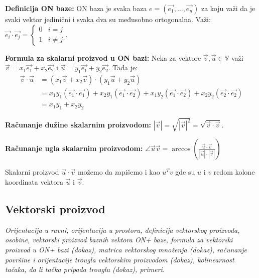 \documentclass[12pt]{article}
\newcommand{\vek}[1]{\overrightarrow{#1}}
\begin{document}
\textbf{Definicija ON baze:} ON baza je svaka baza $e=(\vek{e_1},\dotsc,
    \vek{e_n})$ za koju važi da je svaki vektor jedinični i svaka dva su
međusobno ortogonalna. Važi: $\vek{e_i}\cdot\vek{e_j} =
    \begin{cases}
        0 & i=j     \\
        1 & i\neq j
    \end{cases}$.
\par

\textbf{Formula za skalarni proizvod u ON bazi:} Neka za vektore $\vek{v},
    \vek{u}\in\mathbb{V}$ važi $\vek{v}=x_1\vek{e_1}+x_2\vek{e_2}$ i
$\vek{u}=y_1\vek{e_1}+y_2\vek{e_2}$. Tada je:
\begin{align*}
    \vek{v}\cdot\vek{u} & = (x_1\vek{v}+x_2\vek{v})\cdot(y_1\vek{u}+y_2\vek{u})                                                                             \\
                        & = x_1y_1(\vek{e_1}\cdot\vek{e_1})+x_2y_1(\vek{e_1}\cdot\vek{e_2})+x_1y_2(\vek{e_1}\cdot\vek{e_2})+x_2y_2(\vek{e_2}\cdot\vek{e_2}) \\
                        & = x_1y_1+x_2y_2
\end{align*}
\par

\textbf{Računanje dužine skalarnim proizvodom:} $|\vek{v}|=\sqrt{|\vek{v}|^2}=
    \sqrt{\vek{v}\cdot\vek{v}}$.
\par

\textbf{Računanje ugla skalarnim proizvodom:} $\angle{\vek{u}\vek{v}}=
    \arccos(\frac{\vek{u}\cdot\vek{v}}{|\vek{u}|\cdot|\vek{v}|})$
\par

Skalarni proizvod $\vek{u}\cdot\vek{v}$ možemo da zapišemo i kao $u^Tv$ gde su
$u$ i $v$ redom kolone koordinata vektora $\vek{u}$ i $\vek{v}$.
\par

\subsection{Vektorski proizvod}
\textit{Orijentacija u ravni, orijentacija u prostoru, definicija vektorskog
    proizvoda, osobine, vektorski proizvod baznih vektora ON+ baze, formula za
    vektorski proizvod u ON+ bazi (dokaz), matrica vektorskog množenja (dokaz),
    računanje površine i orijentacije trougla vektorskim proizvodom (dokaz),
    kolinearnost tačaka, da li tačka pripada trouglu (dokaz), primeri.}
\par
\vspace*{1cm}
\end{document}
